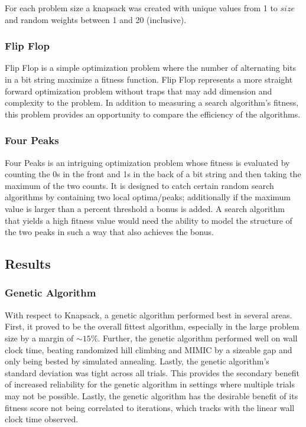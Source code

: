 \documentclass{article}
\begin{document}
For each problem size a knapsack was created with unique values from 1 to $size$ and random weights between 1 and 20 (inclusive).

\subsubsection{Flip Flop}
Flip Flop is a simple optimization problem where the number of alternating bits in a bit string maximize a fitness function. Flip Flop represents a more straight forward optimization problem without traps that may add dimension and complexity to the problem. In addition to measuring a search algorithm's fitness, this problem provides an opportunity to compare the efficiency of the  algorithms.

\subsubsection{Four Peaks}
Four Peaks is an intriguing optimization problem whose fitness is evaluated by counting the 0s in the front and 1s in the back of a bit string and then taking the maximum of the two counts. It is designed to catch certain random search algorithms by containing two local optima/peaks; additionally if the maximum value is larger than a percent threshold a bonus is added. A search algorithm that yields a high fitness value would need the ability to model the structure of the two peaks in such a way that also achieves the bonus.

\subsection{Results}

\subsubsection{Genetic Algorithm}

With respect to Knapsack, a genetic algorithm performed best in several areas. First, it proved to be the overall fittest algorithm, especially in the large problem size by a margin of $\sim15\%$. Further, the genetic algorithm performed well on wall clock time, beating randomized hill climbing and MIMIC by a sizeable gap and only being bested by simulated annealing. Lastly, the genetic algorithm's standard deviation was tight across all trials. This provides the secondary benefit of increased reliability for the genetic algorithm in settings where multiple trials may not be possible. Lastly, the genetic algorithm has the desirable benefit of its fitness score not being correlated to iterations, which tracks with the linear wall clock time observed.
\end{document}
